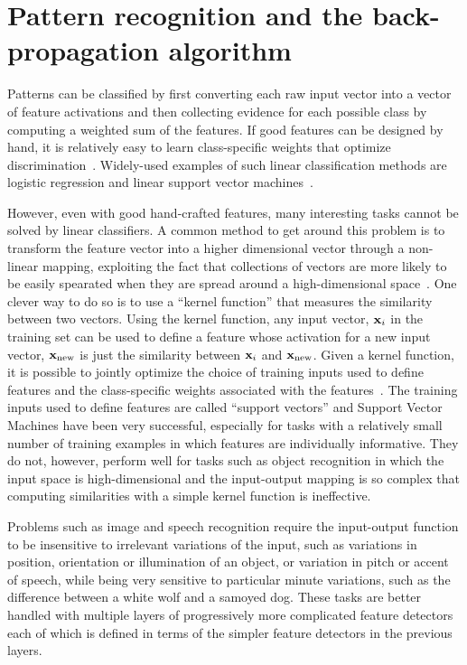 \documentclass[]{article}
\begin{document}
\section{Pattern recognition and the back-propagation algorithm}

Patterns can be classified by first converting each raw input vector into a
vector of feature activations and then collecting evidence for each
possible class by computing a weighted sum of the features. If good
features can be designed by hand, it is relatively easy to learn
class-specific weights that optimize
discrimination~\cite{perceptrons}. Widely-used examples of such linear
classification methods are logistic regression and linear support vector
machines~\cite{logisticregression,svm}.

However, even with good hand-crafted features, many interesting tasks
cannot be solved by linear classifiers. A common method to get around this
problem is to transform the feature vector into a higher dimensional vector
through a non-linear mapping, exploiting the fact that collections of
vectors are more likely to be easily spearated when they are spread around
a high-dimensional space~\cite{cover}. One clever way to do so is to use a
``kernel function'' that measures the similarity between two vectors.
Using the kernel function, any input vector, ${\bf x}_i$ in the training
set can be used to define a feature whose activation for a new input
vector, ${\bf x}_{\rm new}$ is just the similarity between ${\bf x}_i$ and
${\bf x}_{\rm new}$. Given a kernel function, it is possible to jointly
optimize the choice of training inputs used to define features and the
class-specific weights associated with the features~\cite{svm}. The training
inputs used to define features are called ``support vectors'' and Support
Vector Machines\cite{Vapnik} have been very successful, especially for
tasks with a relatively small number of training examples in which features
are individually informative. They do not, however, perform well for tasks
such as object recognition in which the input space is high-dimensional and
the input-output mapping is so complex that computing similarities with a
simple kernel function is ineffective.

Problems such as image and speech recognition require the input-output
function to be insensitive to irrelevant variations of the input, such as
variations in position, orientation or illumination of an object, or
variation in pitch or accent of speech, while being very sensitive to
particular minute variations, such as the difference between a white wolf
and a samoyed dog. These tasks are better handled with multiple layers of
progressively more complicated feature detectors each of which is defined
in terms of the simpler feature detectors in the previous layers.
\end{document}
